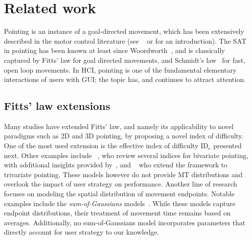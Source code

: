 \documentclass[acmlarge, manuscript,review]{acmart}
\newcommand{\ide}{\ensuremath{{\text{ID}_e}}\xspace}
\begin{document}
\section{Related work\label{sec:rw}}
Pointing is an instance of a goal-directed movement, which has been extensively described in the motor control literature (see \eg~\cite[Section 2]{todorov1998} or \cite{elliott2017} for an introduction). The SAT in pointing has been known at least since Woordworth~\cite{woodworth1899}, and is classically captured by Fitts' law for goal directed movements, and Schmidt's law~\cite{schmidt1979} for fast, open loop movements.
In HCI, pointing is one of the fundamental elementary interactions of users with GUI; the topic has, and continues to attract attention.


\subsection{Fitts' law extensions}
Many studies have extended Fitts' law, and namely its applicability to novel paradigms such as 2D and 3D pointing, by proposing a novel index of difficulty. One of the most used extension is the effective index of difficulty \ide presented next.
Other examples include \citeauthor{accot2003}~\cite{accot2003}, who review several indices for bivariate pointing, with additional insights provided by~\cite{grossman2005b}, and \citeauthor{murata2001}~\cite{murata2001} who extend the framework to trivariate pointing. 
These models however do not provide MT distributions and overlook the impact of user strategy on performance. 
Another line of research focuses on modeling the spatial distribution of movement endpoints. Notable examples include the \textit{sum-of-Gaussians} models~\cite{bi2013, yamanaka2020, zhang2023}. While these models capture endpoint distributions, their treatment of movement time remains based on averages. Additionally, no sum-of-Gaussians model incorporates parameters that directly account for user strategy to our knowledge.


\end{document}
